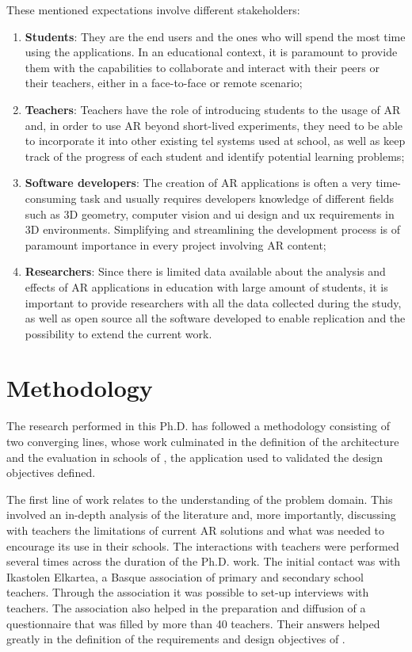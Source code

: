 These mentioned expectations involve different stakeholders: 
\begin{enumerate}
    \item \textbf{Students}: They are the end users and the ones who will spend the most time using the applications. In an educational context, it is paramount to provide them with the capabilities to collaborate and interact with their peers or their teachers, either in a face-to-face or remote scenario;
    \item \textbf{Teachers}: Teachers have the role of introducing students to the usage of AR and, in order to use AR beyond short-lived experiments, they need to be able to incorporate it into other existing \gls{tel} systems used at school, as well as keep track of the progress of each student and identify potential learning problems;
    \item \textbf{Software developers}: The creation of AR applications is often a very time-consuming task and usually requires developers knowledge of different fields such as 3D geometry, computer vision and \gls{ui} design and \gls{ux} requirements in 3D environments. Simplifying and streamlining the development process is of paramount importance in every project involving AR content;
    \item \textbf{Researchers}: Since there is limited data available about the analysis and effects of AR applications in education with large amount of students, it is important to provide researchers with all the data collected during the study, as well as open source all the software developed to enable replication and the possibility to extend the current work.
\end{enumerate}

\section{Methodology}\label{sec:methodology}
The research performed in this Ph.D. has followed a methodology consisting of two converging lines, whose work culminated in the definition of the \arch{} architecture and the evaluation in schools of \appname{}, the application used to validated the design objectives defined.

The first line of work relates to the understanding of the problem domain. This involved an in-depth analysis of the literature and, more importantly, discussing with teachers the limitations of current AR solutions and what was needed to encourage its use in their schools. The interactions with teachers were performed several times across the duration of the Ph.D. work. The initial contact was with Ikastolen Elkartea, a Basque association of primary and secondary school teachers. Through the association it was possible to set-up interviews with teachers. The association also helped in the preparation and diffusion of a questionnaire that was filled by more than 40 teachers. Their answers helped greatly in the definition of the requirements and design objectives of \arch.

